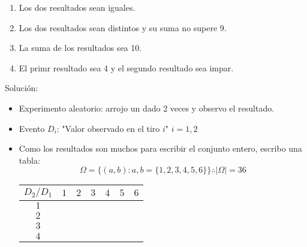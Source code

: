 \documentclass[../main.tex]{subfiles}
\begin{document}
\begin{defexamples}
\begin{enumerate}
            \begin{enumerate}
                \item  Los dos resultados sean iguales.
                \item Los dos resultados sean distintos y su suma no supere 9.
                \item La suma de los resultados sea 10.
                \item El primr resultado sea 4 y el segundo resultado sea impar.
            \end{enumerate}
            Solución:
            \begin{itemize}
                \item Experimento aleatorio: arrojo un dado 2 veces y observo el resultado.
                \item Evento $D_{i}$: "Valor observado en el tiro $i$" $i = 1, 2$
                \item Como los resultados son muchos para escribir el conjunto entero, escribo una tabla:
                    \begin{equation*}
                        \Omega = \{(a, b) : a, b = \{1, 2, 3, 4, 5, 6\}\} \therefore \mid\Omega\mid = 36
                    \end{equation*}
                    \begin{table}[H]
                        \begin{center}
                            \begin{tabular}{c|c|c|c|c|c|c}
                                $D_{2}/D_{1}$ & $1$ & $2$ & $3$ & $4$ & $5$ & $6$\\
                                \hline
                                $1$ & \cellcolor{orange} & \cellcolor{cyan} & \cellcolor{cyan} & \cellcolor{cyan}{$\cdot$} & \cellcolor{cyan} & \cellcolor{cyan}\\
                                \hline
                                $2$ & \cellcolor{cyan} & \cellcolor{orange} & \cellcolor{cyan} & \cellcolor{cyan} & \cellcolor{cyan} & \cellcolor{cyan}\\
                                \hline
                                $3$ & \cellcolor{cyan} & \cellcolor{cyan} & \cellcolor{orange} & \cellcolor{cyan}{$\cdot$} & \cellcolor{cyan} & \cellcolor{cyan}\\
                                \hline
                                $4$ & \cellcolor{cyan} & \cellcolor{cyan} & \cellcolor{cyan} & \cellcolor{orange} & \cellcolor{cyan} & \cellcolor{pink}\\

\end{tabular}
\end{center}
\end{table}
\end{itemize}
\end{enumerate}
\end{defexamples}
\end{document}
